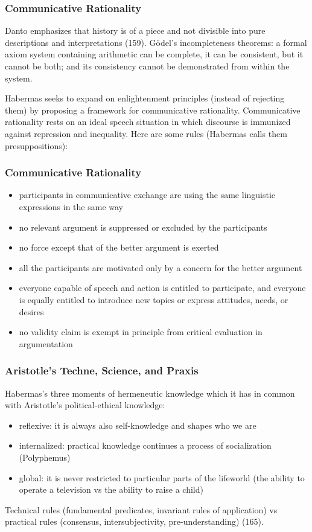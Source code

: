 \documentclass[xcolor=dvipsnames]{beamer}
\begin{document}
\begin{frame}
  \frametitle{Communicative Rationality}
Danto emphasizes that history is of a piece and not divisible into
pure descriptions and interpretations (159). G{\"o}del's
incompleteness theorems: a formal axiom system containing arithmetic
can be complete, it can be consistent, but it cannot be both; and its
consistency cannot be demonstrated from within the system.

\bigskip

Habermas seeks to expand on enlightenment principles (instead of
rejecting them) by proposing a framework for \alert{communicative
  rationality}. Communicative rationality rests on an ideal speech
situation in which discourse is immunized against repression and
inequality. Here are some rules (Habermas calls them presuppositions):
\end{frame}

\begin{frame}
  \frametitle{Communicative Rationality}
\begin{itemize}
\item participants in communicative exchange are using the same
  linguistic expressions in the same way
\item no relevant argument is suppressed or excluded by the
  participants
\item no force except that of the better argument is exerted
\item all the participants are motivated only by a concern for the
  better argument
\item everyone capable of speech and action is entitled to
  participate, and everyone is equally entitled to introduce new
  topics or express attitudes, needs, or desires
\item no validity claim is exempt in principle from critical
  evaluation in argumentation
\end{itemize}
\end{frame}

\begin{frame}
  \frametitle{Aristotle's Techne, Science, and Praxis}
  Habermas's three moments of hermeneutic knowledge which it has in
  common with Aristotle's political-ethical knowledge:
  \begin{itemize}
  \item reflexive: it is always also self-knowledge and shapes who
    we are
  \item internalized: practical knowledge continues a process of
    socialization (Polyphemus)
  \item global: it is never restricted to particular parts of the
    lifeworld (the ability to operate a television vs the ability to
    raise a child)
  \end{itemize}
  Technical rules (fundamental predicates, invariant rules of
  application) vs practical rules (consensus, intersubjectivity,
  pre-understanding) (165).
\end{frame}
\end{document}
